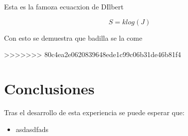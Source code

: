 \documentclass[11pt,onecolumn]{article}
\begin{document}
Esta es la famoza ecuacxion de DIlbert

	$$S = k log(J)$$
	
Con esto se demuestra que badilla se la come

>>>>>>> 80c4ea2e0620839648ede1c99c06b31de46b81f4










\newpage
\section{Conclusiones}

Tras el desarrollo de esta experiencia se puede esperar que:
\begin{itemize}
\item asdasdfads

\end{itemize}
\end{document}
